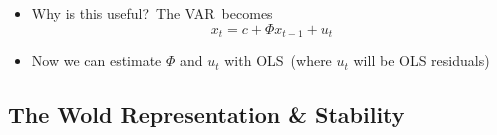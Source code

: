 \documentclass[10pt,handout]{beamer}
\begin{document}
\begin{frame}
\begin{itemize}
\item Why is this useful?\ The VAR\ becomes%
\begin{equation*}
x_{t}=c+\Phi x_{t-1}+u_{t}
\end{equation*}%
\vspace{-.3cm}

\item Now we can estimate $\Phi $ and $u_{t}$ with OLS\ (where $u_{t}$ will
be OLS residuals)
\end{itemize}
\end{frame}
\shownotesblock{}

\subsection{The Wold Representation \& Stability}
\begin{frame}
\color{title}  \par\bigskip
\color{note} 
\end{frame}
\shownotesblock{}
\end{document}
